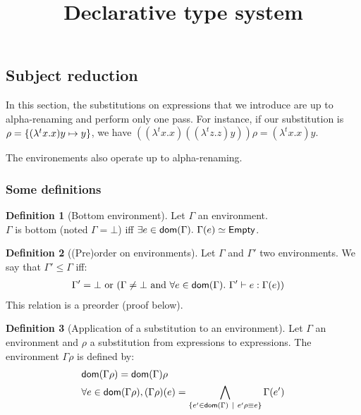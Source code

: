 \documentclass[a4paper]{article}
\title{\vspace{1.5cm}Declarative type system}
\author{}
\date{\vspace{-5ex}}
\theoremstyle{definition}
\newtheorem{definition}{Definition}
\begin{document}
  \maketitle

  \subsection{Subject reduction}

  In this section, the substitutions on expressions that we introduce are up to alpha-renaming and perform only one pass.
  For instance, if our substitution is $\rho=\{(\lambda^t x. x) y \mapsto y\}$, we have $((\lambda^t x. x)((\lambda^t z. z) y))\rho = (\lambda^t x. x) y$.
  
  The environements also operate up to alpha-renaming.

    \subsubsection{Some definitions}

    \begin{definition}[Bottom environment]
      Let $\Gamma$ an environment.\\
      $\Gamma$ is bottom (noted $\Gamma = \bot$) iff $\exists e\in\dom\Gamma.\ \Gamma(e)\simeq\Empty$.
    \end{definition}

      \begin{definition}[(Pre)order on environments]
        Let $\Gamma$ and $\Gamma'$ two environments. We say that $\Gamma' \leq \Gamma$ iff:
        \begin{align*}
          &\Gamma'=\bot \text{ or } (\Gamma\neq\bot \text{ and } \forall e \in \textsf{dom}(\Gamma).\ \Gamma' \vdash e : \Gamma(e))
        \end{align*}
        This relation is a preorder (proof below).
      \end{definition}
    
      \begin{definition}[Application of a substitution to an environment]
        Let $\Gamma$ an environment and $\rho$ a substitution from expressions to expressions.
        The environment $\Gamma\rho$ is defined by:
        \begin{align*}
          &\textsf{dom}(\Gamma\rho) = \textsf{dom}(\Gamma) \rho\\
          &\forall e \in \textsf{dom}(\Gamma\rho), (\Gamma\rho)(e) = \bigwedge_{\{e' \in \textsf{dom}(\Gamma) ~|~ e'\rho\equiv e\}}\Gamma(e')
        \end{align*}
      \end{definition}
    
\end{document}
